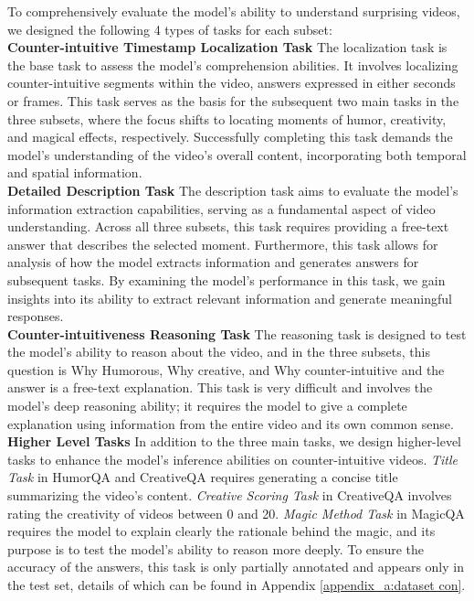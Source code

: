 To comprehensively evaluate the model's ability to understand surprising videos, we designed the following 4 types of tasks for each subset: \\
\noindent\textbf{Counter-intuitive Timestamp Localization Task}\quad
The localization task is the base task to assess the model's comprehension abilities. It involves localizing counter-intuitive segments within the video, answers expressed in either seconds or frames. This task serves as the basis for the subsequent two main tasks in the three subsets, where the focus shifts to locating moments of humor, creativity, and magical effects, respectively. Successfully completing this task demands the model's understanding of the video's overall content, incorporating both temporal and spatial information.\\
\noindent\textbf{Detailed Description Task}\quad
The description task aims to evaluate the model's information extraction capabilities, serving as a fundamental aspect of video understanding. Across all three subsets, this task requires providing a free-text answer that describes the selected moment. Furthermore, this task allows for analysis of how the model extracts information and generates answers for subsequent tasks. By examining the model's performance in this task, we gain insights into its ability to extract relevant information and generate meaningful responses.\\
\noindent\textbf{Counter-intuitiveness Reasoning Task}\quad
The reasoning task is designed to test the model's ability to reason about the video, and in the three subsets, this question is Why Humorous, Why creative, and Why counter-intuitive and the answer is a free-text explanation. This task is very difficult and involves the model's deep reasoning ability; it requires the model to give a complete explanation using information from the entire video and its own common sense.\\
\noindent\textbf{Higher Level Tasks}\quad
In addition to the three main tasks, we design higher-level tasks to enhance the model's inference abilities on counter-intuitive videos. \textit{Title Task} in HumorQA and CreativeQA requires generating a concise title summarizing the video's content. \textit{Creative Scoring Task} in CreativeQA involves rating the creativity of videos between 0 and 20. \textit{Magic Method Task} in MagicQA requires the model to explain clearly the rationale behind the magic, and its purpose is to test the model's ability to reason more deeply. To ensure the accuracy of the answers, this task is only partially annotated and appears only in the test set, details of which can be found in Appendix \ref{appendix_a:dataset con}.
